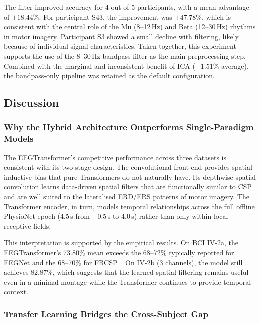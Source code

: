 \documentclass[12pt, a4paper]{article}
\begin{document}
The filter improved accuracy for 4 out of 5 participants, with a mean advantage of $+18.44\%$. For participant S43, the improvement was $+47.78\%$, which is consistent with the central role of the Mu (8--12\,Hz) and Beta (12--30\,Hz) rhythms in motor imagery. Participant S3 showed a small decline with filtering, likely because of individual signal characteristics. Taken together, this experiment supports the use of the 8--30\,Hz bandpass filter as the main preprocessing step. Combined with the marginal and inconsistent benefit of ICA ($+1.51\%$ average), the bandpass-only pipeline was retained as the default configuration.

\subsection{Discussion}

\subsubsection{Why the Hybrid Architecture Outperforms Single-Paradigm Models}
\label{sec:disc_hybrid}

The EEGTransformer's competitive performance across three datasets is consistent with its two-stage design. The convolutional front-end provides spatial inductive bias that pure Transformers do not naturally have. Its depthwise spatial convolution learns data-driven spatial filters that are functionally similar to CSP and are well suited to the lateralised ERD/ERS patterns of motor imagery. The Transformer encoder, in turn, models temporal relationships across the full offline PhysioNet epoch (4.5\,s from $-0.5$\,s to $4.0$\,s) rather than only within local receptive fields.

This interpretation is supported by the empirical results. On BCI IV-2a, the EEGTransformer's 73.80\% mean exceeds the 68--72\% typically reported for EEGNet and the 68--70\% for FBCSP~\cite{hameed2025enhancing}. On IV-2b (3 channels), the model still achieves 82.87\%, which suggests that the learned spatial filtering remains useful even in a minimal montage while the Transformer continues to provide temporal context.

\subsubsection{Transfer Learning Bridges the Cross-Subject Gap}
\end{document}
